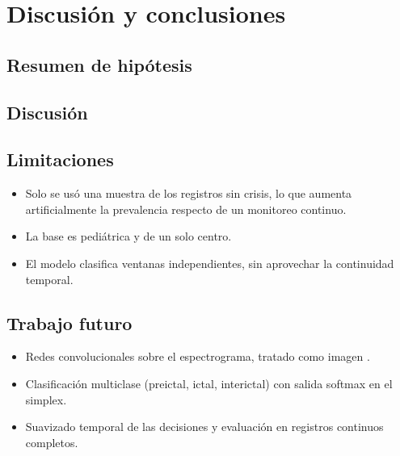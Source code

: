 \chapter{Discusión y conclusiones}
\label{cap:conclusiones}

\section{Resumen de hipótesis}

\section{Discusión}

\section{Limitaciones}
\begin{itemize}
  \item Solo se usó una muestra de los registros sin crisis, lo que aumenta artificialmente la prevalencia respecto de un monitoreo continuo.
  \item La base es pediátrica y de un solo centro.
  \item El modelo clasifica ventanas independientes, sin aprovechar la continuidad temporal.
\end{itemize}

\section{Trabajo futuro}
\begin{itemize}
  \item Redes convolucionales sobre el espectrograma, tratado como imagen \parencite{gonzalez2018}.
  \item Clasificación multiclase (preictal, ictal, interictal) con salida softmax en el simplex.
  \item Suavizado temporal de las decisiones y evaluación en registros continuos completos.
\end{itemize}
